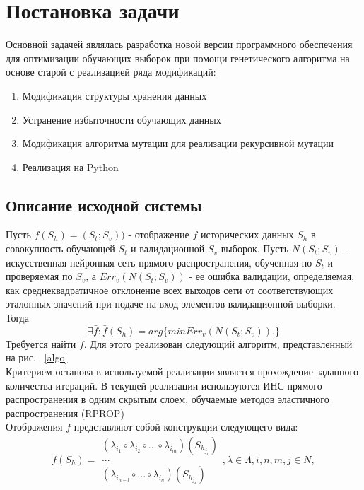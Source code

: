 \documentclass[utf8,usehyperref,12pt]{G7-32}
\begin{document}
\chapter{Постановка задачи}
Основной задачей являлась разработка новой версии программного обеспечения для оптимизации обучающих выборок при помощи генетического алгоритма на основе старой с реализацией ряда модификаций:
\begin{enumerate}
\item Модификация структуры хранения данных
\item Устранение избыточности обучающих данных
\item Модификация алгоритма мутации для реализации рекурсивной мутации
\item Реализация на Python
\end{enumerate}
\section{Описание исходной системы}
Пусть $ f(S_{h})=(S_{t}; S_{v})) $ - отображение $f$ исторических данных $S_{h}$ в совокупность обучающей $S_{t}$ и валидационной $S_{v}$ выборок. Пусть $ N(S_{t}; S_{v}) $ - искусственная нейронная сеть прямого распространения, обученная по $S_{t}$ и проверяемая по $S_{v}$, а $ Err_{v}(N(S_{t}; S_{v})) $ - ее ошибка валидации, определяемая, как среднеквадратичное отклонение всех выходов сети от соответствующих эталонных значений при подаче на вход элементов валидационной выборки. Тогда
\begin{equation}
\exists\bar{f}:\bar{f}(S_{h})=arg\{min Err_{v}(N(S_{t}; S_{v})). \}
\end{equation}
Требуется найти $ \bar{f} $. Для этого реализован следующий алгоритм, представленный на рис. ~\ref{algo} \\
Критерием останова в используемой реализации является прохождение заданного количества итераций. В текущей реализации используются ИНС прямого распространения в одним скрытым слоем, обучаемые методов эластичного распространения (RPROP)\\
Отображения $f$ представляют собой конструкции следующего вида:
\begin{equation}
f(S_{h})=\begin{array}{|c|}
(\lambda_{i_{1}} \circ \lambda_{i_{2}} \circ ... \circ \lambda_{i_{m}})(S_{h_{j_{1}}}) \\
...\\
(\lambda_{i_{n-l}} \circ ... \circ \lambda_{i_{n}})(S_{h_{j_{k}}})
\end{array}
, \lambda\in\Lambda, i,n,m,j\in N,
\end{equation}
\end{document}

